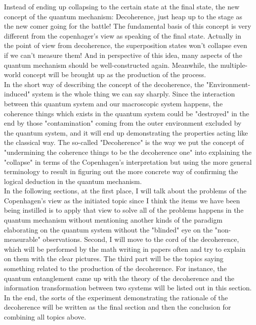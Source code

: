 \documentclass[final,1p,12pt]{elsarticle}
\begin{document}
Instead of ending up collapsing to the certain state at the final state, the new concept of the quantum mechanism: Decoherence, just heap up to the stage as the new comer going for the battle! The fundamental basis of this concept is very different from the copenhager's view as speaking of the final state. Actually in the point of view from decoherence, the superposition states won't collapse even if we can't measure them! And in perspective of this idea, many aspects of the quantum mechanism should be well-constructed again. Meanwhile, the multiple-world concept will be brought up as the production of the process.\\ 

In the short way of describing the concept of the decoherence, the "Environment-induced" system is the whole thing we can say sharply. Since the interaction between this quantum system and our macroscopic system happens, the coherence things which exists in the quantum system could be "destroyed" in the end by those "contamination" coming from the outer environment excluded by the quantum system, and it will end up demonstrating the properties acting like the classical way. The so-called "Decoherence" is the way we put the concept of "undermining the coherence things to be the decoherence one" into explaining the "collapse" in terms of the Copenhagen's interpretation but using the more general terminology to result in figuring out the more concrete way of confirming the logical deduction in the quantum mechanism.\\ 

In the following sections, at the first place, I will talk about the problems of the Copenhagen's view as the initiated topic since I think the items we have been being instilled is to apply that view to solve all of the problems happens in the quantum mechanism without mentioning another kinds of the paradigm elaborating on the quantum system without the "blinded" eye on the "non-measurable" observations. Second, I will move to the cord of the decoherence, which will be performed by the math writing in papers often and try to explain on them with the clear pictures. The third part will be the topics saying something related to the production of the decoherence. For instance, the quantum entanglement came up with the theory of the decoherence and the information transformation between two systems will be listed out in this section. In the end, the sorts of the experiment demonstrating the rationale of the decoherence will be written as the final section and then the conclusion for combining all topics above.\\
\end{document}
